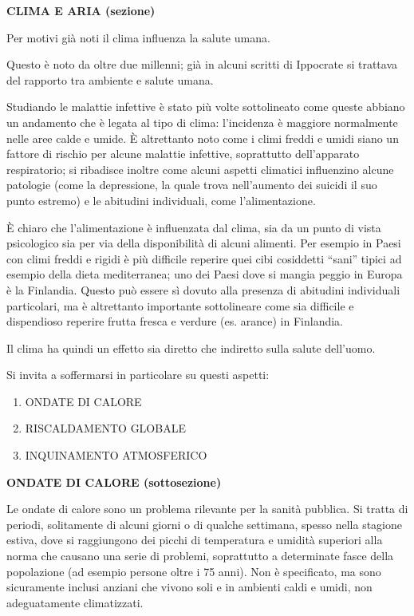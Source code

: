 \documentclass[]{article}
\begin{document}
\textbf{CLIMA E ARIA (sezione)}

Per motivi già noti il clima influenza la salute umana.

Questo è noto da oltre due millenni; già in alcuni scritti di Ippocrate
si trattava del rapporto tra ambiente e salute umana.

Studiando le malattie infettive è stato più volte sottolineato come
queste abbiano un andamento che è legata al tipo di clima: l'incidenza è
maggiore normalmente nelle aree calde e umide. È altrettanto noto come i
climi freddi e umidi siano un fattore di rischio per alcune malattie
infettive, soprattutto dell'apparato respiratorio; si ribadisce inoltre
come alcuni aspetti climatici influenzino alcune patologie (come la
depressione, la quale trova nell'aumento dei suicidi il suo punto
estremo) e le abitudini individuali, come l'alimentazione.

È chiaro che l'alimentazione è influenzata dal clima, sia da un punto di
vista psicologico sia per via della disponibilità di alcuni alimenti.
Per esempio in Paesi con climi freddi e rigidi è più difficile reperire
quei cibi cosiddetti ``sani'' tipici ad esempio della dieta
mediterranea; uno dei Paesi dove si mangia peggio in Europa è la
Finlandia. Questo può essere sì dovuto alla presenza di abitudini
individuali particolari, ma è altrettanto importante sottolineare come
sia difficile e dispendioso reperire frutta fresca e verdure (es.
arance) in Finlandia.

Il clima ha quindi un effetto sia diretto che indiretto sulla salute
dell'uomo.

Si invita a soffermarsi in particolare su questi aspetti:

\begin{enumerate}
\def\labelenumi{\arabic{enumi}.}
\item
  ONDATE DI CALORE
\item
  RISCALDAMENTO GLOBALE
\item
  INQUINAMENTO ATMOSFERICO
\end{enumerate}

\textbf{ONDATE DI CALORE (sottosezione)}

Le ondate di calore sono un problema rilevante per la sanità pubblica.
Si tratta di periodi, solitamente di alcuni giorni o di qualche
settimana, spesso nella stagione estiva, dove si raggiungono dei picchi
di temperatura e umidità superiori alla norma che causano una serie di
problemi, soprattutto a determinate fasce della popolazione (ad esempio
persone oltre i 75 anni). Non è specificato, ma sono sicuramente inclusi
anziani che vivono soli e in ambienti caldi e umidi, non adeguatamente
climatizzati.
\end{document}
